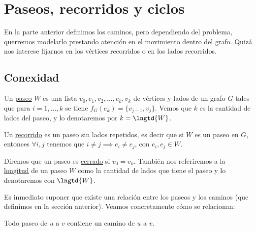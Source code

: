 \section{Paseos, recorridos y ciclos}

En la parte anterior definimos los caminos, pero dependiendo del problema, querremos modelarlo prestando atención en el movimiento dentro del grafo. Quizá nos interese fijarnos en los vértices recorridos o en los lados recorridos.

\subsection{Conexidad}

\begin{defn}
    Un \ul{paseo} $W$ es una lista $v_0, e_1, v_2, \dots, e_k, v_k$ de vértices y lados de un grafo $G$ tales que para $i = 1, \dots, k$ se tiene $f_G(e_k) = \{v_{j-1},v_j\}$. Vemos que $k$ es la cantidad de lados del paseo, y lo denotaremos por $k = \lngtd{W}$.
    
    Un \ul{recorrido} es un paseo sin lados repetidos, es decir que si $W$ es un paseo en $G$, entonces $\forall i,j$ tenemos que $i \neq j \implies e_i \neq e_j$, con $e_i, e_j \in W$.
    
    Diremos que un paseo es \ul{cerrado} si $v_0 = v_k$. También nos referiremos a la \ul{longitud} de un paseo $W$ como la cantidad de lados que tiene el paseo y lo denotaremos con $\lngtd{W}$.
\end{defn}

Es inmediato suponer que existe una relación entre los paseos y los caminos (que definimos en la sección anterior). Veamos concretamente cómo se relacionan:

\begin{lem}
    Todo paseo de $u$ a $v$ contiene un camino de $u$ a $v$.
\end{lem}

